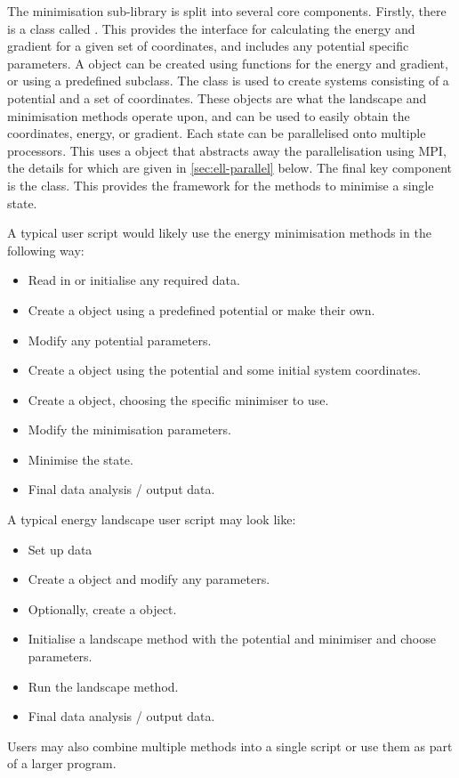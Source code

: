The minimisation sub-library is split into several core components.
Firstly, there is a class called .
This provides the interface for calculating the energy and gradient for a given set of coordinates, and includes any potential specific parameters.
A  object can be created using functions for the energy and gradient, or using a predefined subclass.
The  class is used to create systems consisting of a potential and a set of coordinates.
These  objects are what the landscape and minimisation methods operate upon, and can be used to easily obtain the coordinates, energy, or gradient.
Each state can be parallelised onto multiple processors.
This uses a  object that abstracts away the parallelisation using MPI, the details for which are given in \cref{sec:ell-parallel} below.
The final key component is the  class.
This provides the framework for the methods to minimise a single state.

A typical user script would likely use the energy minimisation methods in the following way:
\begin{itemize}
  \item Read in or initialise any required data.
  \item Create a  object using a predefined potential or make their own.
  \item Modify any potential parameters.
  \item Create a  object using the potential and some initial system coordinates.
  \item Create a  object, choosing the specific minimiser to use.
  \item Modify the minimisation parameters.
  \item Minimise the state.
  \item Final data analysis / output data.
\end{itemize}
A typical energy landscape user script may look like:
\begin{itemize}
  \item Set up data
  \item Create a  object and modify any parameters.
  \item Optionally, create a  object.
  \item Initialise a landscape method with the potential and minimiser and choose parameters.
  \item Run the landscape method.
  \item Final data analysis / output data.
\end{itemize}
Users may also combine multiple methods into a single script or use them as part of a larger program.


